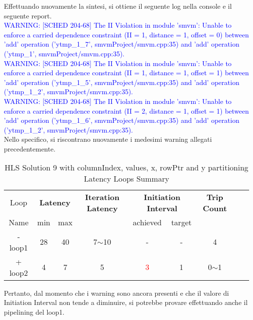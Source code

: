 

Effettuando nuovamente la sintesi, si ottiene il seguente log nella console e il seguente report.
\\
\textcolor{blue}{WARNING: [SCHED 204-68] The II Violation in module 'smvm': Unable to enforce a carried dependence constraint (II = 1, distance = 1, offset = 0)
	between 'add' operation ('ytmp\_1\_7', smvmProject/smvm.cpp:35) and 'add' operation ('ytmp\_1', smvmProject/smvm.cpp:35).}
\\
\textcolor{blue}{WARNING: [SCHED 204-68] The II Violation in module 'smvm': Unable to enforce a carried dependence constraint (II = 1, distance = 1, offset = 1)
	between 'add' operation ('ytmp\_1\_5', smvmProject/smvm.cpp:35) and 'add' operation ('ytmp\_1\_2', smvmProject/smvm.cpp:35).}
\\
\textcolor{blue}{WARNING: [SCHED 204-68] The II Violation in module 'smvm': Unable to enforce a carried dependence constraint (II = 2, distance = 1, offset = 1)
	between 'add' operation ('ytmp\_1\_6', smvmProject/smvm.cpp:35) and 'add' operation ('ytmp\_1\_2', smvmProject/smvm.cpp:35).}
\\
Nello specifico, si riscontrano nuovamente i medesimi warning allegati precedentemente.

\begin{table}[H]
	\centering
	\begin{tabular}{|c|c|c|c|c|c|c|c|c|}
		\hline
		\multicolumn{1}{|c|}{Loop} & \multicolumn{2}{|c|}{\textbf{Latency}} & \multicolumn{1}{c|}{\textbf{Iteration Latency}} & \multicolumn{2}{c|}{\textbf{Initiation Interval}} & \multicolumn{1}{c|}{\textbf{Trip Count}}  \\
		Name & min & max &  & achieved & target &  \\
		\hline
		- loop1 & 28 & 40 & 7$\sim$10 & - & - & 4 \\
		+ loop2 & 4 & 7 & 5 & \textcolor{red}{3} & 1 & 0$\sim$1 \\
		\hline
	\end{tabular}
	\caption{HLS Solution 9 with columnIndex, values, x, rowPtr and y partitioning Latency Loops Summary}
	\label{tab:hls-solution-9-columnindex-values-partitioning-loop-summary}
\end{table}

Pertanto, dal momento che i warning sono ancora presenti e che il valore di Initiation Interval non tende a diminuire, si potrebbe provare effettuando anche il pipelining del loop1.

